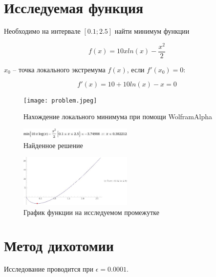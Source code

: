 \documentclass[12pt]{article}
\begin{document}
\section{Исследуемая функция}

Необходимо на интервале $[0.1; 2.5]$ найти минимум функции 

\begin{equation*}
f(x)=10xln(x)-\frac{x^2}{2}
\end{equation*}

$x_0$ -- точка локального экстремума $f(x)$, если $f'(x_0) = 0$:

\begin{equation*}
f'(x)=10+10ln(x)-x=0
\end{equation*}

\begin{figure}[h]
\centering
\texttt{[image: problem.jpeg]}
\caption{Нахождение локального минимума при помощи WolframAlpha}
\end{figure}

\begin{figure}[h]
\centering
\includegraphics[width=0.5\textwidth]{solution.jpeg}
\caption{Найденное решение}
\end{figure}

\begin{figure}[h]
\centering
\includegraphics[width=0.5\textwidth]{graphic.jpeg}
\caption{График функции на исследуемом промежутке}
\end{figure}

\newpage
\section{Метод дихотомии}

Исследование проводится при $\epsilon = 0.0001$.
\end{document}
